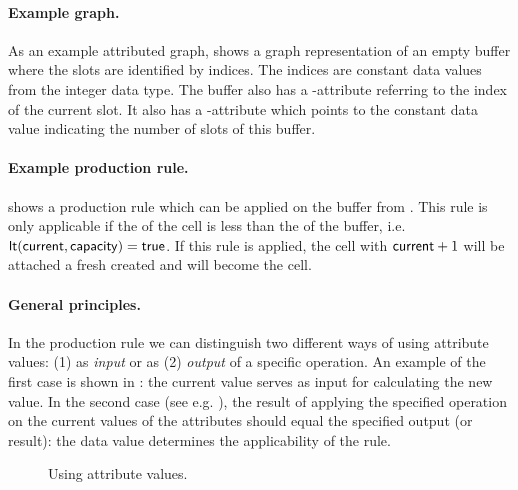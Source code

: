 \paragraph{Example graph.}

As an example attributed graph,  shows a graph
representation of an empty buffer where the slots are identified by
indices. The indices are constant data values from the integer data
type. The buffer also has a \current-attribute referring to the index
of the current slot. It also has a \capacity-attribute which points to
the constant data value indicating the number of slots of this
buffer.


\paragraph{Example production rule.}

 shows a production rule which can
be applied on the buffer from . This rule
is only applicable if the \bufferIndex{} of the \current{} cell is less than
the \capacity{} of the buffer, i.e. $\mathsf{lt}(\mathsf{current},\mathsf{capacity}) =
\mathsf{true}$. If this rule is applied, the cell with \bufferIndex{}
$\mathsf{current} + 1$ will be attached a fresh created \Object{} and will
become the \current{} cell.


\paragraph{General principles.} In the production rule we can
distinguish two different ways of using attribute values: (1) as
\emph{input} or as (2) \emph{output} of a specific operation. An
example of the first case is shown in : the current value
serves as input for calculating the new value. In the second case
(see e.g. ), the result of applying the specified
operation on the current values of the attributes should equal the
specified output (or result): the data value determines the
applicability of the rule.

\begin{figure}[htbp]
\begin{center}
\caption{Using attribute values.}
\end{center}
\end{figure}

